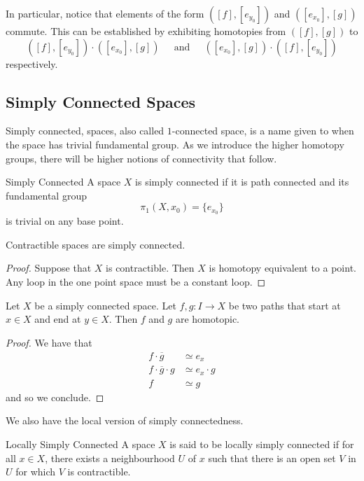 \documentclass[a4paper]{article}
\begin{document}
In particular, notice that elements of the form $([f],[e_{y_0}])$ and $([e_{x_0}],[g])$ commute. This can be established by exhibiting homotopies from $([f],[g])$ to $$([f],[e_{y_0}])\cdot([e_{x_0}],[g])\;\;\;\;\text{ and }\;\;\;\;([e_{x_0}],[g])\cdot([f],[e_{y_0}])$$ respectively. 

\subsection{Simply Connected Spaces}
Simply connected, spaces, also called $1$-connected space, is a name given to when the space has trivial fundamental group. As we introduce the higher homotopy groups, there will be higher notions of connectivity that follow. 

\begin{defn}{Simply Connected}{} A space $X$ is simply connected if it is path connected and its fundamental group $$\pi_1(X,x_0)=\{e_{x_0}\}$$ is trivial on any base point. 
\end{defn}

\begin{prp}{}{} Contractible spaces are simply connected. \tcbline
\begin{proof}
Suppose that $X$ is contractible. Then $X$ is homotopy equivalent to a point. Any loop in the one point space must be a constant loop. 
\end{proof}
\end{prp}

\begin{lmm}{}{} Let $X$ be a simply connected space. Let $f,g:I\to X$ be two paths that start at $x\in X$ and end at $y\in X$. Then $f$ and $g$ are homotopic. \tcbline
\begin{proof}
We have that 
\begin{align*}
f\cdot\overline{g}&\simeq e_x\\
f\cdot\overline{g}\cdot g&\simeq e_x\cdot g\\
f&\simeq g
\end{align*}
and so we conclude. 
\end{proof}
\end{lmm}

We also have the local version of simply connectedness. 

\begin{defn}{Locally Simply Connected}{} A space $X$ is said to be locally simply connected if for all $x\in X$, there exists a neighbourhood $U$ of $x$ such that there is an open set $V$ in $U$ for which $V$ is contractible. 
\end{defn}
\end{document}
